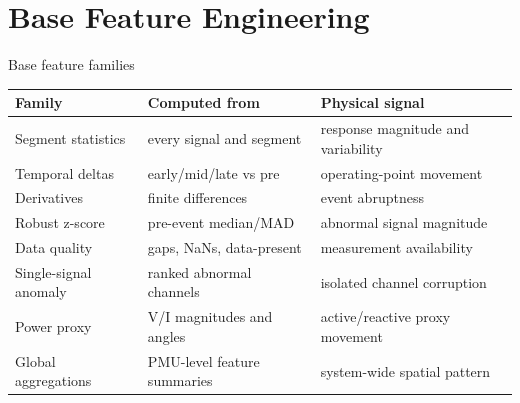 ﻿\documentclass[10pt,aspectratio=169]{beamer}
\begin{document}
\section{Base Feature Engineering}


\begin{frame}{Base feature families}
\small
\centering
\begin{tabular}{p{}p{}p{}}
\toprule
\textbf{Family} & \textbf{Computed from} & \textbf{Physical signal}\\
\midrule
Segment statistics & every signal and segment & response magnitude and variability\\
Temporal deltas & early/mid/late vs pre & operating-point movement\\
Derivatives & finite differences & event abruptness\\
Robust z-score & pre-event median/MAD & abnormal signal magnitude\\
Data quality & gaps, NaNs, data-present & measurement availability\\
Single-signal anomaly & ranked abnormal channels & isolated channel corruption\\
Power proxy & V/I magnitudes and angles & active/reactive proxy movement\\
Global aggregations & PMU-level feature summaries & system-wide spatial pattern\\
\bottomrule
\end{tabular}
\end{frame}
\end{document}
